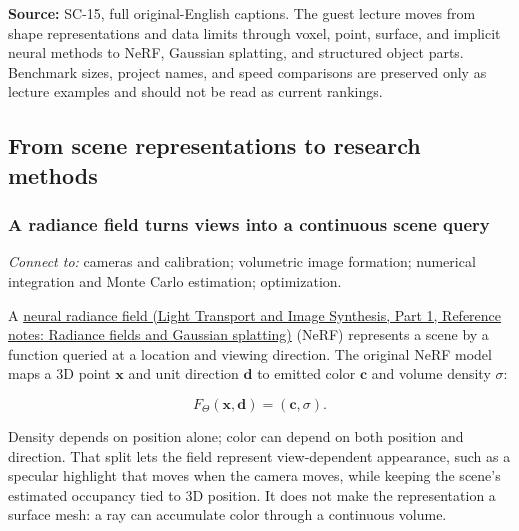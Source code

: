 \textbf{Source:} SC-15, full original-English captions. The guest lecture moves from shape representations and data limits through voxel, point, surface, and implicit neural methods to NeRF, Gaussian splatting, and structured object parts. Benchmark sizes, project names, and speed comparisons are preserved only as lecture examples and should not be read as current rankings.

\subsection{From scene representations to research methods}\label{04-visual-computing-ii-ch034-from-scene-representations-to-research-methods}

\hypertarget{04-visual-computing-ii-ch034-from-scene-representations-to-research-methods}{}

\subsubsection{A radiance field turns views into a continuous scene query}\label{04-visual-computing-ii-ch034-a-radiance-field-turns-views-into-a-continuous-scene-query}

\hypertarget{04-visual-computing-ii-ch034-a-radiance-field-turns-views-into-a-continuous-scene-query}{}

\emph{Connect to:} cameras and calibration; volumetric image formation; numerical integration and Monte Carlo estimation; optimization.

A \href{../04-Light-Transport-and-Image-Synthesis-P01/main.pdf\#appendix-c5b332e400e7}{neural radiance field (Light Transport and Image Synthesis, Part 1, Reference notes: Radiance fields and Gaussian splatting)} (NeRF) represents a scene by a function queried at a location and viewing direction. The original NeRF model maps a 3D point \(\mathbf{x}\) and unit direction \(\mathbf{d}\) to emitted color \(\mathbf{c}\) and volume density \(\sigma\):

\[F_\Theta(\mathbf{x},\mathbf{d})=(\mathbf{c},\sigma).\]

Density depends on position alone; color can depend on both position and direction. That split lets the field represent view-dependent appearance, such as a specular highlight that moves when the camera moves, while keeping the scene's estimated occupancy tied to 3D position. It does not make the representation a surface mesh: a ray can accumulate color through a continuous volume.

